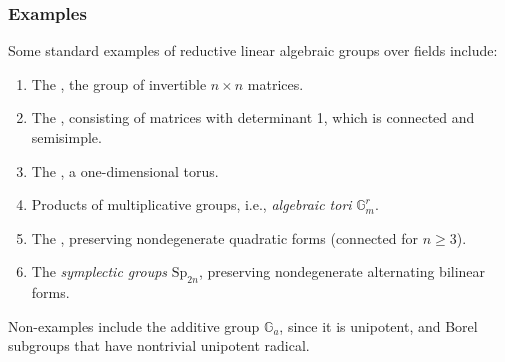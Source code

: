 \subsubsection{Examples}

\begin{example}
    Some standard examples of reductive linear algebraic groups over fields include:
    \begin{enumerate}
        \item The , the group of invertible $n \times n$ matrices.
        \item The , consisting of matrices with determinant 1, which is connected and semisimple.
        \item The , a one-dimensional torus.
        \item Products of multiplicative groups, i.e., \emph{algebraic tori} $\mathbb{G}_m^r$.
        \item The , preserving nondegenerate quadratic forms (connected for $n \geq 3$).
        \item The \emph{symplectic groups} $\mathrm{Sp}_{2n}$, preserving nondegenerate alternating bilinear forms.
    \end{enumerate}
    Non-examples include the additive group $\mathbb{G}_a$, since it is unipotent, and Borel subgroups that have nontrivial unipotent radical.
\end{example}

